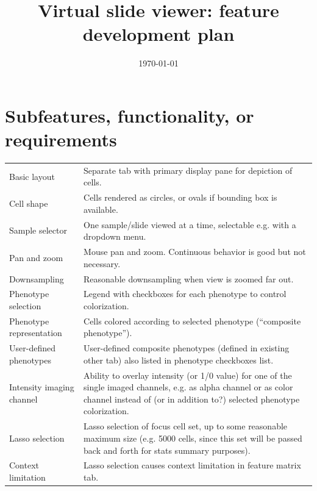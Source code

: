 \documentclass[10pt]{article}
\begin{document}
\title{Virtual slide viewer: feature development plan \vspace{-2em}}
\date{\today}
\maketitle

\section*{Subfeatures, functionality, or requirements}
\begin{center}
{
\renewcommand{\arraystretch}{1.3}
\begin{tabular}{| p{} | p{} |}
\hline
Basic layout & Separate tab with primary display pane for depiction of cells. \\
Cell shape & Cells rendered as circles, or ovals if bounding box is available. \\
Sample selector & One sample/slide viewed at a time, selectable e.g. with a dropdown menu. \\
Pan and zoom & Mouse pan and zoom. Continuous behavior is good but not necessary. \\
Downsampling & Reasonable downsampling when view is zoomed far out. \\
Phenotype selection & Legend with checkboxes for each phenotype to control colorization. \\
Phenotype representation & Cells colored according to selected phenotype (``composite phenotype''). \\
User-defined phenotypes & User-defined composite phenotypes (defined in existing other tab) also listed in phenotype checkboxes list. \\
Intensity imaging channel & Ability to overlay intensity (or 1/0 value) for one of the single imaged channels, e.g. as alpha channel or as color channel instead of (or in addition to?) selected phenotype colorization. \\
Lasso selection & Lasso selection of focus cell set, up to some reasonable maximum size (e.g. 5000 cells, since this set will be passed back and forth for stats summary purposes). \\
Context limitation & Lasso selection causes context limitation in feature matrix tab. \\ \hline
\end{tabular}
}
\end{center}

\end{document}
